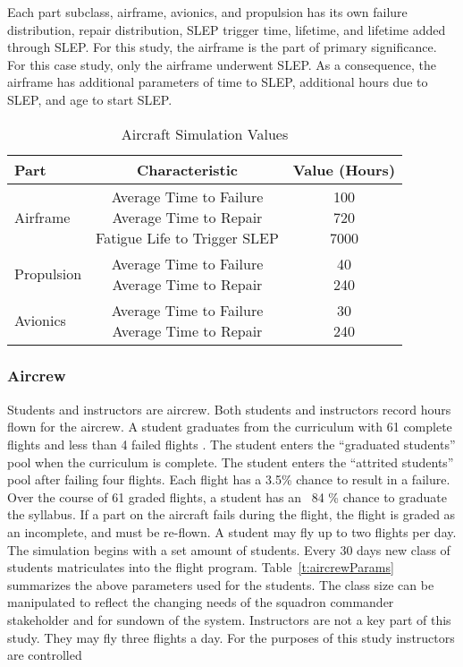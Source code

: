 Each part subclass, airframe, avionics, and propulsion has its own
failure distribution, repair distribution, SLEP trigger time,
lifetime, and lifetime added through SLEP. For this study, the
airframe is the part of primary significance. For  this case study,
only the airframe underwent SLEP. As a consequence, the airframe has
additional parameters of time to SLEP, additional  hours due to SLEP,
and age to start SLEP.

\begin{table}[h]
  \centering
  \begin{tabular}{l c c}
    \hline
    \hline
    \textbf{Part} & \textbf{Characteristic} & \textbf{Value (Hours)} \\
    \hline
    Airframe & \makecell{ Average Time to Failure \\ Average Time to
      Repair \\ Fatigue Life to Trigger SLEP}  &
    \makecell{ 100 \\ 720 \\ 7000} \\
    \hline
    Propulsion & \makecell{ Average Time to Failure \\ Average Time to
      Repair}  &
    \makecell{ 40 \\ 240 \\ } \\
    \hline
    Avionics & \makecell{ Average Time to Failure \\ Average Time to
      Repair}  &
    \makecell{ 30 \\ 240 \\ } \\
    \hline
  \end{tabular}
  \caption{Aircraft Simulation Values}
  \label{t:PartSettings}
\end{table}



\subsubsection{Aircrew}

Students and instructors are aircrew. Both
students and instructors record hours flown for the aircrew.  A
student graduates from the curriculum with 61 complete flights and
less than 4 failed 
flights \cite{Air2009}. The student enters the ``graduated students''
pool when the curriculum is complete. The student enters the
``attrited students'' pool after failing four flights. Each flight has
a 3.5\% chance to result in a failure. Over the course of 61 graded
flights, a student has an ~84 \% chance to graduate the syllabus. If a
part on the aircraft fails during the flight, the 
flight is graded as an incomplete, and must be re-flown. A student may
fly up to two flights per day. The simulation begins with a set
amount of students. Every 30 days new class of students
matriculates into the flight program. Table~\ref{t:aircrewParams}
summarizes the above parameters used for the students. The class size
can be manipulated to reflect the changing needs of the squadron
commander stakeholder and for sundown of the system. Instructors are
not a key part of this study. They may fly three flights a
day. For the purposes of this study instructors are controlled

